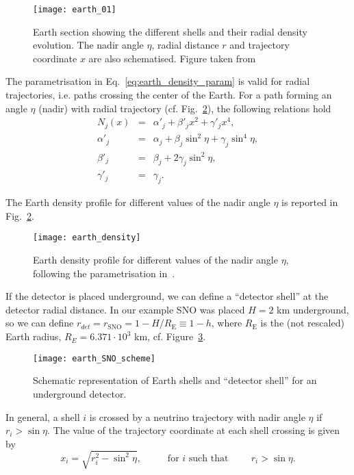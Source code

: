 \documentclass{article}
\begin{document}
\begin{figure}[ht]
	\texttt{[image: earth\_01]}
	\caption{Earth section showing the different shells and their radial density evolution. The nadir angle $\eta$, radial distance $r$ and trajectory coordinate $x$ are also schematised. Figure taken from~\cite{Lisi:1997yc}}
	\label{fig:earth_density}	
\end{figure}

The parametrisation in Eq.~\ref{eq:earth_density_param} is valid for radial trajectories, i.e. paths crossing the center of the Earth. For a path forming an angle $\eta$ (nadir) with radial trajectory (cf. Fig.~\ref{fig:earth_density}), the following relations hold
\begin{eqnarray}
	N_j(x) &=& \alpha'_j + \beta'_j x^2 + \gamma'_j x^4, \label{eq:earth_density_nadir} \\
	\alpha'_j &=& \alpha_j + \beta_j \sin^2 \eta + \gamma_j \sin^4\eta, \\
	\beta'_j &=& \beta_j + 2 \gamma_j \sin^2\eta, \\
	\gamma'_j &=& \gamma_j.
\end{eqnarray}

The Earth density profile for different values of the nadir angle $\eta$ is reported in Fig.~\ref{fig:earth_density}.

\begin{figure}[ht]
	\texttt{[image: earth\_density]}
	\caption{Earth density profile for different values of the nadir angle $\eta$, following the parametrisation in~\cite{Lisi:1997yc}.}
	\label{fig:earth_density}
\end{figure}

If the detector is placed underground, we can define a ``detector shell'' at the detector radial distance. In our example SNO was placed $H=2$ km underground, so we can define $r_{det} = r_\text{SNO} = 1 - H /R_\text{E} \equiv 1 - h$, where $R_\text{E}$ is the (not rescaled) Earth radius, $R_E = 6.371 \cdot 10^3$ km, cf. Figure~\ref{fig:scheme_detector_shell}.

\begin{figure}[ht]
	\texttt{[image: earth\_SNO\_scheme]}
	\caption{Schematic representation of Earth shells and ``detector shell'' for an underground detector.}
	\label{fig:scheme_detector_shell}
\end{figure} 

In general, a shell $i$ is crossed by a neutrino trajectory with nadir angle $\eta$ if $r_i > \sin \eta$. The value of the trajectory coordinate at each shell crossing is given by 
\begin{equation}
	x_i = \sqrt{r_i^2 - \sin^2 \eta}, \hspace{1cm} \text{ for $i$ such that} \hspace{1cm} r_i > \sin \eta.
\end{equation}
\end{document}
